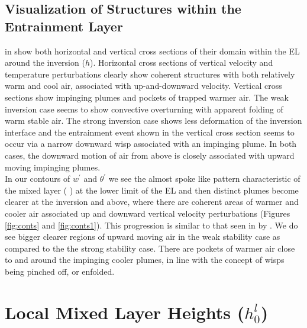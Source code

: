 
\subsection{Visualization of Structures within the Entrainment Layer}
\FloatBarrier

\citeauthor{SullMoengStev} in \cite{SullMoengStev} show both horizontal and vertical cross sections
of their domain within the \acs{EL} around the inversion ($h$).  Horizontal cross sections of vertical
velocity and temperature perturbations clearly show coherent structures with both relatively
warm and cool air, associated with up-and-downward velocity.  Vertical cross sections show
impinging plumes and pockets of trapped warmer air.  The weak inversion case seems to show
convective overturning with apparent folding of warm stable air.  The strong inversion
case shows less deformation of the inversion interface and the entrainment event 
shown in the vertical cross section seems to occur via a narrow downward wisp associated
with an impinging plume.  In both cases, the downward motion of air from above is closely associated
with upward moving impinging plumes.\\

In our contours of $w^{'}$ and $\theta^{'}$ we see the almost spoke like pattern characteristic of the
mixed layer (\citeauthor{SchmidtSchu} \cite{SchmidtSchu}) at the lower limit of the \acs{EL}
and then distinct plumes become clearer at the inversion and above, where there are coherent
areas of warmer and cooler air associated up and downward vertical velocity perturbations (Figures \ref{fig:conts} and \ref{fig:conts1}).  
This progression is similar to that seen in \cite{GarciaMellado} by \citeauthor{GarciaMellado}.  
We do see bigger clearer regions of upward moving air in the weak stability case as compared to the
the strong stability case. There are pockets of warmer air close to and around the impinging cooler plumes, in line with the concept of wisps being pinched off, or enfolded.



\section{Local Mixed Layer Heights ($h_{0}^{l}$)}
\label{sec:locmlh}     
\FloatBarrier


